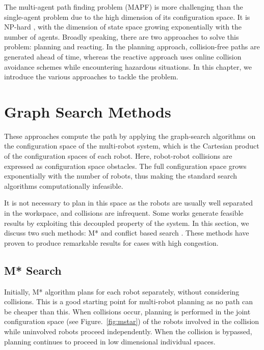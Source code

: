 The multi-agent path finding problem (MAPF) is more challenging than the single-agent problem due to the high dimension of its configuration space. It is NP-hard \cite{yu2013structure}, with the dimension of state space growing exponentially with the number of agents.  Broadly speaking, there are two approaches to solve this problem: planning and reacting. In the planning approach, collision-free paths are generated ahead of time, whereas the reactive approach uses online collision avoidance schemes while encountering hazardous situations. In this chapter, we introduce the various approaches to tackle the problem. 

\section{Graph Search Methods}
These approaches compute the path by applying the graph-search algorithms on the configuration space of the multi-robot system, which is the Cartesian product of the configuration spaces of each robot. Here, robot-robot collisions are expressed as configuration space obstacles. The full configuration space grows exponentially with the number of robots, thus making the standard search algorithms computationally infeasible. 

It is not necessary to plan in this space as the robots are usually well separated in the workspace, and collisions are infrequent. Some works generate feasible results by exploiting this decoupled property of the system. In this section, we discuss two such methods: M* \cite{wagner2011m} and conflict based search \cite{sharon2015conflict}. These methods have proven to produce remarkable results for cases with high congestion. 
\subsection{M* Search}
Initially, M* algorithm plans for each robot separately, without considering collisions. This is a good starting point for multi-robot planning as no path can be cheaper than this. When collisions occur, planning is performed in the joint configuration space (see Figure.~\ref{fig:mstar}) of the robots involved in the collision while uninvolved robots proceed independently. When the collision is bypassed, planning continues to proceed in low dimensional individual spaces. 

